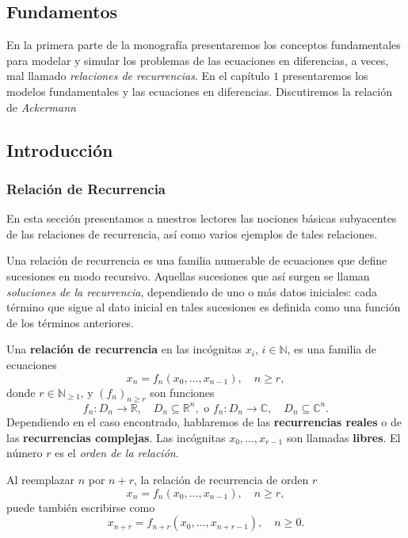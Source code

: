 \begin{partbacktext}
\part{Fundamentos}
En la primera parte de la monografía presentaremos los conceptos fundamentales para modelar y simular los problemas de las ecuaciones en diferencias, a veces, mal llamado \emph{relaciones de recurrencias}. En el capítulo $1$ presentaremos los modelos fundamentales y las ecuaciones en diferencias. Discutiremos la relación de \emph{Ackermann}
\end{partbacktext}
\chapter{Introducción}
\section{Relación de Recurrencia}
En esta sección presentamos a nuestros lectores las nociones básicas subyacentes de las relaciones de recurrencia, así como varios ejemplos de tales relaciones.

Una relación de recurrencia es una familia numerable de ecuaciones que define sucesiones en modo recursivo. Aquellas sucesiones que así surgen se llaman \emph{soluciones de la recurrencia}, dependiendo de uno o más datos iniciales: cada término que sigue al dato inicial en tales sucesiones es definida como una función de los términos anteriores.

\begin{definition}
	Una \textbf{relación de recurrencia} en las incógnitas $x_{i}$, $i\in\mathds{N}$, es una familia de ecuaciones
	\begin{equation*}
	x_{n}=f_{n}\left(x_{0},\ldots,x_{n-1}\right),\quad n\geq r,
	\end{equation*}
	donde $r\in\mathds{N}_{\geq1}$, y ${\left(f_{n}\right)}_{n\geq r}$ son funciones
	\begin{equation*}
	f_{n}\colon D_{n}\rightarrow\mathds{R},\quad D_{n}\subseteq\mathds{R}^{n},\text{ o }f_{n}\colon D_{n}\rightarrow\mathds{C},\quad D_{n}\subseteq\mathds{C}^{n}.
	\end{equation*}
	Dependiendo en el caso encontrado, hablaremos de las \textbf{recurrencias reales} o de las \textbf{recurrencias complejas}. Las incógnitas $x_{0},\ldots,x_{r-1}$ son llamadas \textbf{libres}. El número $r$ es el \emph{orden de la relación}.
	
	Al reemplazar $n$ por $n+r$, la relación de recurrencia de orden $r$
	\begin{equation*}
	x_{n}=f_{n}\left(x_{0},\ldots,x_{n-1}\right),\quad n\geq r,
	\end{equation*}
	puede también escribirse como
	\begin{equation*}
	x_{n+r}=f_{n+r}\left(x_{0},\ldots,x_{n+r-1}\right),\quad n\geq0.
	\end{equation*}
\end{definition}


